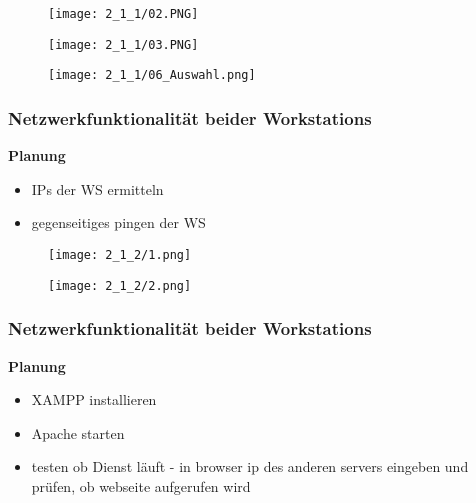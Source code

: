     \begin{figure}[H]
        \centering
        \texttt{[image: 2\_1\_1/02.PNG]}
    \end{figure}

    \begin{figure}[H]
        \centering
        \texttt{[image: 2\_1\_1/03.PNG]}
    \end{figure}

    \begin{figure}[H]
        \centering
        \texttt{[image: 2\_1\_1/06\_Auswahl.png]}
    \end{figure}


\subsubsection{Netzwerkfunktionalität beider Workstations}
    \textbf{Planung}
    \begin{itemize}
        \item IPs der WS ermitteln
        \item gegenseitiges pingen der WS
    \end{itemize}

    \begin{figure}[H]
        \centering
        \texttt{[image: 2\_1\_2/1.png]}
    \end{figure}

    \begin{figure}[H]
        \centering
        \texttt{[image: 2\_1\_2/2.png]}
    \end{figure}


\subsubsection{Netzwerkfunktionalität beider Workstations}
    \textbf{Planung}
    \begin{itemize}
        \item XAMPP installieren 
        \item Apache starten
        \item testen ob Dienst läuft - in browser ip des anderen servers eingeben und prüfen, ob webseite aufgerufen wird 
    \end{itemize}

